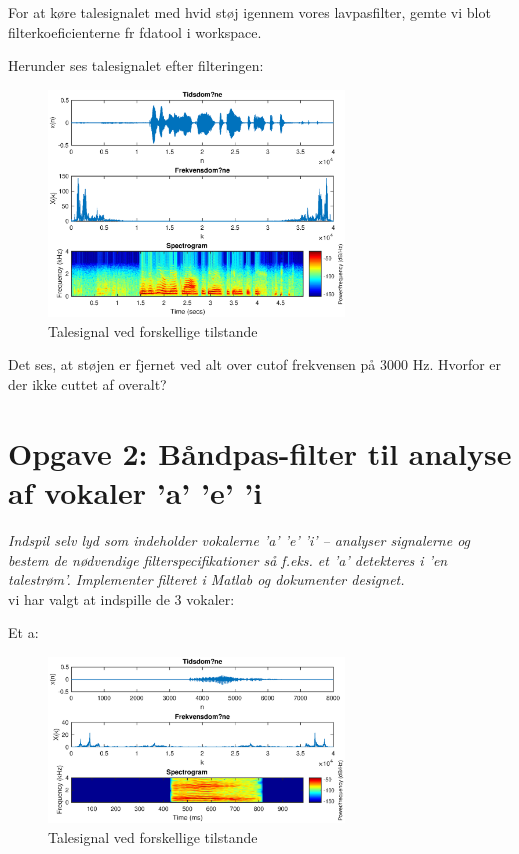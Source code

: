 \documentclass[a4paper]{report}
\begin{document}
For at køre talesignalet med hvid støj igennem vores lavpasfilter, gemte vi blot filterkoeficienterne fr fdatool i workspace. 

Herunder ses talesignalet efter filteringen: 

\begin{figure}[H] 
\centering
\includegraphics[width=0.7\textwidth]{grafer/opg1_filter}
\caption{Talesignal ved forskellige tilstande} \label{opg1_filter}
\end{figure}


Det ses, at støjen er fjernet ved alt over cutof frekvensen på 3000 Hz. Hvorfor er der ikke cuttet af overalt? 

\section*{Opgave 2: Båndpas-filter til analyse af vokaler ’a’  ’e’  ’i}
\textit{Indspil selv lyd som indeholder vokalerne ’a’  ’e’  ’i’ – analyser signalerne og bestem de nødvendige filterspecifikationer så f.eks. et ’a’ detekteres i ’en talestrøm’. Implementer filteret i Matlab og dokumenter designet.}\\


vi har valgt at indspille de 3 vokaler: 

Et a: 

\begin{figure}[H] 
\centering
\includegraphics[width=0.7\textwidth]{grafer/opg2_a}
\caption{Talesignal ved forskellige tilstande} \label{opg2_a}
\end{figure}
\end{document}

